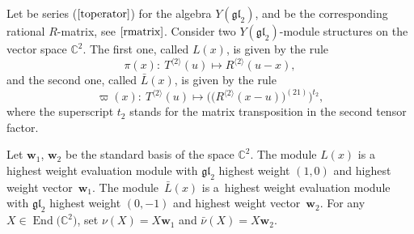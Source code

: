 \documentclass[10pt,a4paper]{amsart}
\numberwithin{equation}{section}
\newcommand\ltwo{\langle 2\rangle}
\begin{document}
Let \smash{$T_{a b}^{\ltwo}(u)$} be series ($\ref{toperator}$) for the algebra $Y(\mathfrak{g l}_{2})$, and \smash{$R^{\ltwo}(u)$} be the corresponding rational $R$-matrix, see $\eqref{rmatrix}$. Consider two $Y(\mathfrak{g l}_{2})$-module structures on the vector space $\mathbb{C}^2$. The first one, called $L(x)$, is given by the rule
\begin{equation*}
\pi(x)\colon \ T^{\ltwo}(u) \mapsto R^{\ltwo}(u-x),
\end{equation*}
and the second one, called $\bar{L}(x)$, is given by the rule
\begin{equation*}
\varpi(x)\colon \ T^{\ltwo}(u) \mapsto\bigl( \bigl(R^{\ltwo}(x-u)\bigr)^{(21)}\bigr)^{t_{2}},
\end{equation*}
where the superscript $t_{2}$ stands for the matrix transposition in the second tensor factor.

Let $\mathbf{w}_{1}$, $\mathbf{w}_{2}$ be the standard basis of the space $\mathbb{C}^{2}$. The module $L(x)$ is a highest weight evaluation module with $\mathfrak{g l}_{2} $ highest weight $(1, 0)$ and highest weight vector~$\mathbf{w}_{1}$. The module~$\bar{L}(x)$ is a~highest weight evaluation module with $\mathfrak{g l}_{2}$ highest weight $(0,-1)$ and highest weight vector~$\mathbf{w}_{2}$.
For any $X\in \operatorname{End}\bigl(\mathbb{C}^{2}\bigr)$, set $\nu(X)=X \mathbf{w}_{1}$ and $\bar{\nu}(X)=X \mathbf{w}_{2}$.
\end{document}
